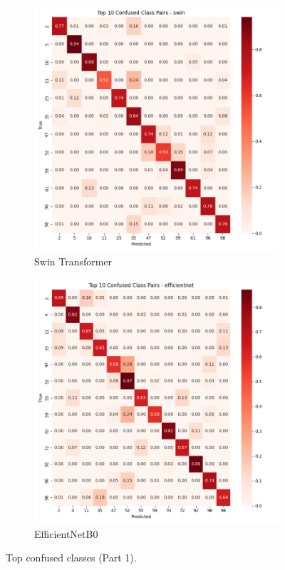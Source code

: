 \documentclass[11pt]{article}
\begin{document}
\begin{figure}[htbp]
\vspace{0.2cm}

\begin{subfigure}[b]{0.48\textwidth}
\includegraphics[width=\textwidth]{confusion_matrix_swin_top_confused.png}
\caption{Swin Transformer}
\end{subfigure}
\hfill
\begin{subfigure}[b]{0.48\textwidth}
\includegraphics[width=\textwidth]{confusion_matrix_efficientnetb0_top_confused.png}
\caption{EfficientNetB0}
\end{subfigure}

\caption{Top confused classes (Part 1).}
\label{fig:top_confused_part1}
\end{figure}
\end{document}
